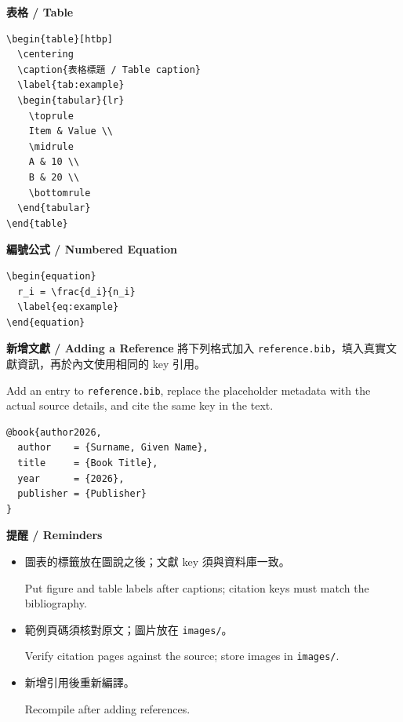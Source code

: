 \documentclass[11pt,a4paper]{article}
\begin{document}
\noindent\begin{minipage}{\linewidth}
\textbf{表格 / Table}
\begin{verbatim}
\begin{table}[htbp]
  \centering
  \caption{表格標題 / Table caption}
  \label{tab:example}
  \begin{tabular}{lr}
    \toprule
    Item & Value \\
    \midrule
    A & 10 \\
    B & 20 \\
    \bottomrule
  \end{tabular}
\end{table}
\end{verbatim}
\end{minipage}\par\medskip

\noindent\textbf{編號公式 / Numbered Equation}
\begin{verbatim}
\begin{equation}
  r_i = \frac{d_i}{n_i}
  \label{eq:example}
\end{equation}
\end{verbatim}

\noindent\textbf{新增文獻 / Adding a Reference}
將下列格式加入 \texttt{reference.bib}，填入真實文獻資訊，再於內文使用相同的 key 引用。

Add an entry to \texttt{reference.bib}, replace the placeholder metadata with the actual source details, and cite the same key in the text.
\begin{verbatim}
@book{author2026,
  author    = {Surname, Given Name},
  title     = {Book Title},
  year      = {2026},
  publisher = {Publisher}
}
\end{verbatim}

\noindent\textbf{提醒 / Reminders}
\begin{itemize}
  \item 圖表的標籤放在圖說之後；文獻 key 須與資料庫一致。\par
  Put figure and table labels after captions; citation keys must match the bibliography.
  \item 範例頁碼須核對原文；圖片放在 \texttt{images/}。\par
  Verify citation pages against the source; store images in \texttt{images/}.
  \item 新增引用後重新編譯。\par
  Recompile after adding references.
\end{itemize}
\clearpage
\end{document}
